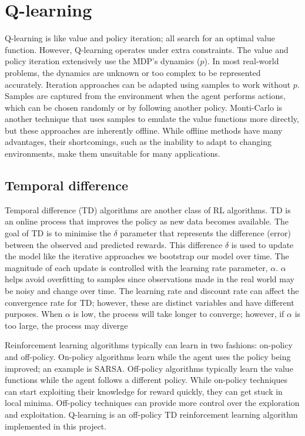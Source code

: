 \documentclass[]{final_report}
\begin{document}
\section{Q-learning}\label{chap:q-learning}


Q-learning is like value and policy iteration; all search for an optimal value function. However, Q-learning operates under extra constraints. The value and policy iteration extensively use the MDP's dynamics ($p$). In most real-world problems, the dynamics are unknown or too complex to be represented accurately. Iteration approaches can be adapted using samples to work without $p$. Samples are captured from the environment when the agent performs actions, which can be chosen randomly or by following another policy. Monti-Carlo is another technique that uses samples to emulate the value functions more directly, but these approaches are inherently offline. While offline methods have many advantages, their shortcomings, such as the inability to adapt to changing environments, make them unsuitable for many applications. 

\subsection{Temporal difference}

Temporal difference (TD) algorithms are another class of RL algorithms. TD is an online process that improves the policy as new data becomes available. The goal of TD is to minimise the $\delta$ parameter that represents the difference (error) between the observed and predicted rewards. This difference $\delta$ is used to update the model like the iterative approaches we bootstrap our model over time. The magnitude of each update is controlled with the learning rate parameter, $\alpha$. $\alpha$ helps avoid overfitting to samples since observations made in the real world may be noisy and change over time. The learning rate and discount rate can affect the convergence rate for TD; however, these are distinct variables and have different purposes. When $\alpha$ is low, the process will take longer to converge; however, if $\alpha$ is too large, the process may diverge

Reinforcement learning algorithms typically can learn in two fashions: on-policy and off-policy. On-policy algorithms learn while the agent uses the policy being improved; an example is SARSA. Off-policy algorithms typically learn the value functions while the agent follows a different  policy. While on-policy techniques can start exploiting their knowledge for reward quickly, they can get stuck in local minima. Off-policy techniques can provide more control over the exploration and exploitation. Q-learning is an off-policy TD reinforcement learning algorithm implemented in this project.
\end{document}
